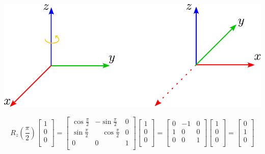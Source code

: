 \begin{frame}
    \begin{center}
    \begin{minipage}{0.26\linewidth}
        \includegraphics[width=\columnwidth]{./images/3d_rotation_example.pdf}
    \end{minipage}
    \hspace{1em}
    \begin{minipage}{0.70\linewidth}
        \small
        \begin{equation*}
            {\displaystyle R_{z}\left(\frac{\pi}{2}\right){\begin{bmatrix}1\\0\\0\\\end{bmatrix}}={\begin{bmatrix}\cos \frac{\pi}{2}&-\sin \frac{\pi}{2}&0\\\sin \frac{\pi}{2}&\quad \cos \frac{\pi}{2}&0\\0&0&1\\\end{bmatrix}}{\begin{bmatrix}1\\0\\0\\\end{bmatrix}}={\begin{bmatrix}0&-1&0\\1&0&0\\0&0&1\\\end{bmatrix}}{\begin{bmatrix}1\\0\\0\\\end{bmatrix}}={\begin{bmatrix}0\\1\\0\\\end{bmatrix}}}
        \end{equation*}
    \end{minipage}
\end{center}

\end{frame}

